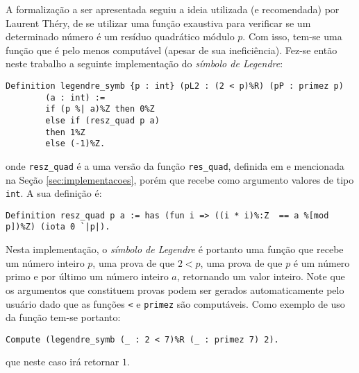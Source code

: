 A formalização a ser apresentada seguiu a ideia utilizada (e recomendada) por Laurent Théry, de se utilizar uma função exaustiva para verificar se um determinado número é um resíduo quadrático módulo $p$. Com isso, tem-se uma função que é pelo menos computável (apesar de sua ineficiência). Fez-se então neste trabalho a seguinte implementação do \textit{símbolo de Legendre}:
        \begin{lstlisting}[language=coq,frame=single,tabsize=1]
Definition legendre_symb {p : int} (pL2 : (2 < p)%R) (pP : primez p) 
        (a : int) :=
        if (p %| a)%Z then 0%Z
        else if (resz_quad p a)
        then 1%Z
        else (-1)%Z.
        \end{lstlisting}
onde \lstinline[language=coq]|resz_quad| é a uma versão da função \lstinline[language=coq]|res_quad|, definida em \cite{mathcomp-extra-euler} e mencionada na Seção \ref{sec:implementacoes}, porém que recebe como argumento valores de tipo \lstinline[language=coq]|int|. A sua definição é:
        \begin{lstlisting}[language=coq,frame=single,tabsize=1]
Definition resz_quad p a := has (fun i => ((i * i)%:Z  == a %[mod p])%Z) (iota 0 `|p|).
        \end{lstlisting}
Nesta implementação, o \textit{símbolo de Legendre} é portanto uma função que recebe um número inteiro $p$, uma prova de que $2 < p$, uma prova de que $p$ é um número primo e por último um número inteiro $a$, retornando um valor inteiro. Note que os argumentos que constituem provas podem ser gerados automaticamente pelo usuário dado que as funções \lstinline[language=coq]!<! e \lstinline[language=coq]!primez! são computáveis. Como exemplo de uso da função tem-se portanto:
        \begin{lstlisting}[language=coq,frame=single,tabsize=1]
Compute (legendre_symb (_ : 2 < 7)%R (_ : primez 7) 2).
        \end{lstlisting}
que neste caso irá retornar $1$.

